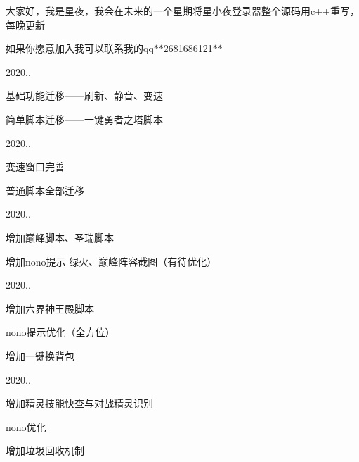 大家好，我是星夜，我会在未来的一个星期将星小夜登录器整个源码用c++重写，每晚更新

如果你愿意加入我可以联系我的qq$\ast$$\ast$2681686121$\ast$$\ast$

2020..


\begin{DoxyEnumerate}
\item 基础功能迁移——刷新、静音、变速
\item 简单脚本迁移——一键勇者之塔脚本
\end{DoxyEnumerate}

2020..


\begin{DoxyEnumerate}
\item 变速窗口完善
\item 普通脚本全部迁移
\end{DoxyEnumerate}

2020..


\begin{DoxyEnumerate}
\item 增加巅峰脚本、圣瑞脚本
\item 增加nono提示-\/绿火、巅峰阵容截图（有待优化）
\end{DoxyEnumerate}

2020..


\begin{DoxyEnumerate}
\item 增加六界神王殿脚本
\item nono提示优化（全方位）
\item 增加一键换背包
\end{DoxyEnumerate}

2020..


\begin{DoxyEnumerate}
\item 增加精灵技能快查与对战精灵识别
\item nono优化
\item 增加垃圾回收机制 
\end{DoxyEnumerate}